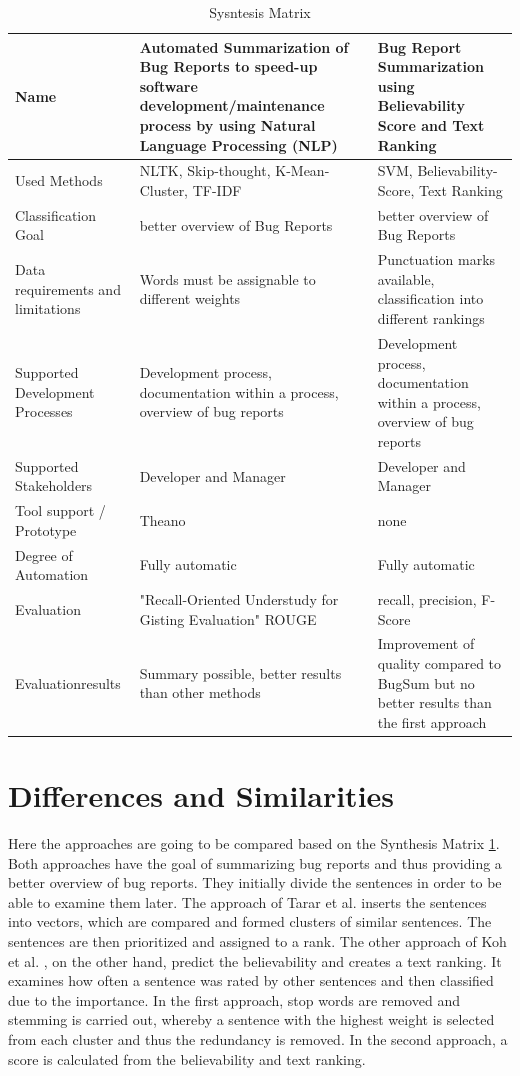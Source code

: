 \documentclass[a4paper,10pt, bibliography=totocnumbered]{scrreprt}
\begin{document}
\begin{table}
\begin{tabular}[h]{p{3cm}|p{5cm}|p{5cm}}
Name & Automated Summarization of Bug Reports to speed-up software development/maintenance process by using Natural Language Processing (NLP) & Bug Report Summarization using Believability Score and Text Ranking \\
\hline
Used Methods & NLTK, Skip-thought, K-Mean-Cluster, TF-IDF & SVM, Believability-Score, Text Ranking \\
\hline
Classification Goal & better overview of Bug Reports & better overview of Bug Reports \\
\hline
Data requirements and limitations & Words must be assignable to different weights & Punctuation marks available, classification into different rankings \\
\hline
Supported Development Processes & Development process, documentation within a process, overview of bug reports
 & Development process, documentation within a process, overview of bug reports
 \\
\hline
Supported Stakeholders & Developer and Manager & Developer and Manager \\
\hline
Tool support / Prototype & Theano & none \\
\hline
Degree of Automation & Fully automatic & Fully automatic \\
\hline
Evaluation & "Recall-Oriented Understudy for Gisting Evaluation" ROUGE
 & recall, precision, F-Score \\
\hline
Evaluationresults & Summary possible, better results than other methods & Improvement of quality compared to BugSum but no better results than the first approach \\
\end{tabular}
\caption{Sysntesis Matrix}
\label{tab:matrix}
\end{table}


\section{Differences and Similarities}
Here the approaches are going to be compared based on the Synthesis Matrix \ref{tab:matrix}. Both approaches have the goal of summarizing bug reports and thus providing a better overview of bug reports. They initially divide the sentences in order to be able to examine them later. The approach of Tarar et al. \cite{tarar} inserts the sentences into vectors, which are compared and formed clusters of similar sentences. The sentences are then prioritized and assigned to a rank. The other approach of Koh et al. \cite{koh}, on the other hand, predict the believability and creates a text ranking. It examines how often a sentence was rated by other sentences and then classified due to the importance. In the first approach, stop words are removed and stemming is carried out, whereby a sentence with the highest weight is selected from each cluster and thus the redundancy is removed. In the second approach, a score is calculated from the believability and text ranking.
\end{document}
